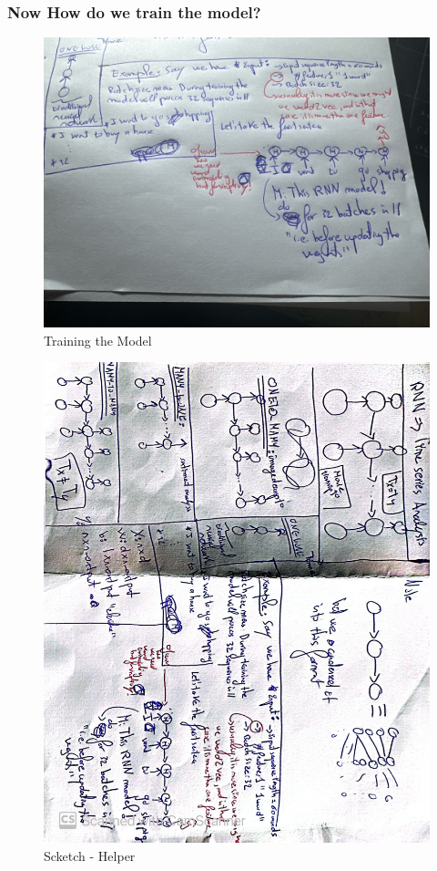 \documentclass{article}
\begin{document}
  \subsubsection*{Now How do we train the model?}
  \begin{figure}[H]
    \centering
    \includegraphics[width = \textwidth]{Images/RNN_SKETCH.jpeg}
    \caption{Training the Model}
  \end{figure}
  \begin{figure}
    \centering
    \includegraphics[width = \textwidth]{Images/2_.jpg}
    \caption{Scketch - Helper}
  \end{figure}
\end{document}
